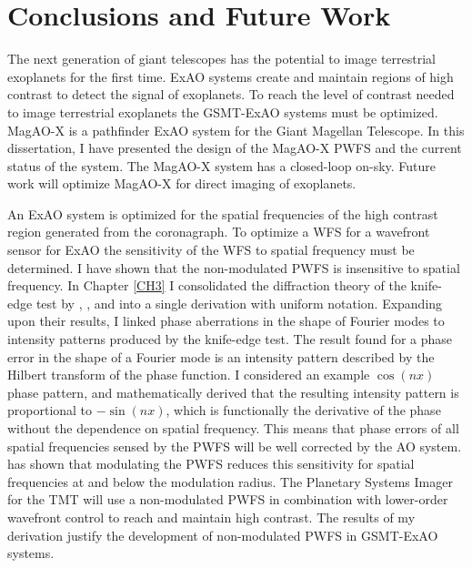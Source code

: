 \chapter{Conclusions and Future Work}\label{CH7}

The next generation of giant telescopes has the potential to image terrestrial exoplanets for the first time. ExAO systems create and maintain regions of high contrast to detect the signal of exoplanets. To reach the level of contrast needed to image terrestrial exoplanets the GSMT-ExAO systems must be optimized. MagAO-X is a pathfinder ExAO system for the Giant Magellan Telescope. In this dissertation, I have presented the design of the MagAO-X PWFS and the current status of the system. The MagAO-X system has a closed-loop on-sky. Future work will optimize MagAO-X for direct imaging of exoplanets.  


An ExAO system is optimized for the spatial frequencies of the high contrast region generated from the coronagraph. To optimize a WFS for a wavefront sensor for ExAO the sensitivity of the WFS to spatial frequency must be determined. I have shown that the non-modulated PWFS is insensitive to spatial frequency. In Chapter \ref{CH3} I consolidated the diffraction theory of the knife-edge test by \cite{linfoot1948theory}, \cite{katzoff1971quantitative}, and \cite{wilson1975wavefront} into a single derivation with uniform notation. Expanding upon their results, I linked phase aberrations in the shape of Fourier modes to intensity patterns produced by the knife-edge test. The result found for a phase error in the shape of a Fourier mode is an intensity pattern described by the Hilbert transform of the phase function. I considered an example $\cos(nx)$ phase pattern, and mathematically derived that the resulting intensity pattern is proportional to $-\sin(nx)$, which is functionally the derivative of the phase without the dependence on spatial frequency. This means that phase errors of all spatial frequencies sensed by the PWFS will be well corrected by the AO system. \cite{verinaud2004nature} has shown that modulating the PWFS reduces this sensitivity for spatial frequencies at and below the modulation radius. The Planetary Systems Imager \cite{fitzgerald2019planetary} for the TMT will use a non-modulated PWFS\cite{guyon2018wavefront} in combination with lower-order wavefront control to reach and maintain high contrast. The results of my derivation justify the development of non-modulated PWFS in GSMT-ExAO systems.

